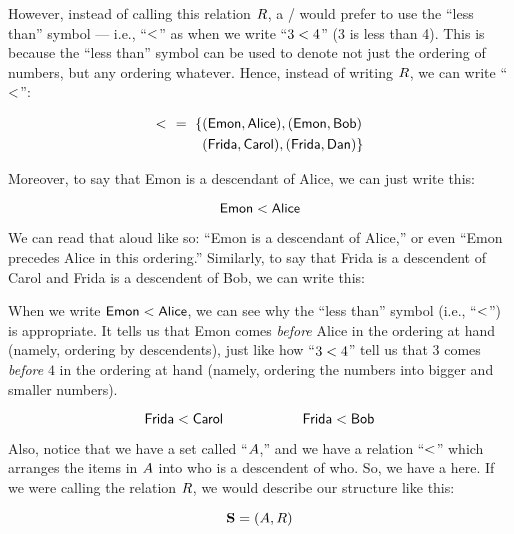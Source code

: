 \documentclass[../../../main.tex]{subfiles}
\begin{document}
However, instead of calling this relation $R$, a \mather/ would prefer to use the ``less than'' symbol --- i.e., ``$\strictorder/$'' as when we write ``$3 \strictorder/ 4$'' (3 is less than 4). This is because the ``less than'' symbol can be used to denote not just the ordering of numbers, but any ordering whatever. Hence, instead of writing $R$, we can write ``$\strictorder/$'':

\begin{align*}
  \strictorder/~~=~\{ &(\e{Emon}, \e{Alice}), (\e{Emon}, \e{Bob}) \\
             &(\e{Frida}, \e{Carol}), (\e{Frida}, \e{Dan}) \}
\end{align*}

Moreover, to say that Emon is a descendant of Alice, we can just write this:

\begin{equation*}
  \e{Emon} \strictorder/ \e{Alice}
\end{equation*}

We can read that aloud like so: ``Emon is a descendant of Alice,'' or even ``Emon precedes Alice in this ordering.'' Similarly, to say that Frida is a descendent of Carol and Frida is a descendent of Bob, we can write this:

\begin{aside}
  \begin{remark}
    When we write $\e{Emon} \strictorder/ \e{Alice}$, we can see why the ``less than'' symbol (i.e., ``$\strictorder/$'') is appropriate. It tells us that Emon comes \emph{before} Alice in the ordering at hand (namely, ordering by descendents), just like how ``$3 \strictorder/ 4$'' tell us that $3$ comes \emph{before} $4$ in the ordering at hand (namely, ordering the numbers into bigger and smaller numbers).
  \end{remark}
\end{aside}

\begin{equation*}
  \e{Frida} \strictorder/ \e{Carol} \hskip 2cm \e{Frida} \strictorder/ \e{Bob}
\end{equation*}

Also, notice that we have a set called ``$A$,'' and we have a relation ``$\strictorder/$'' which arranges the items in $A$ into who is a descendent of who. So, we have a  here. If we were calling the relation $R$, we would describe our structure like this:

\begin{equation*}
  \mathbf{S} = (A, R)
\end{equation*}
\end{document}
